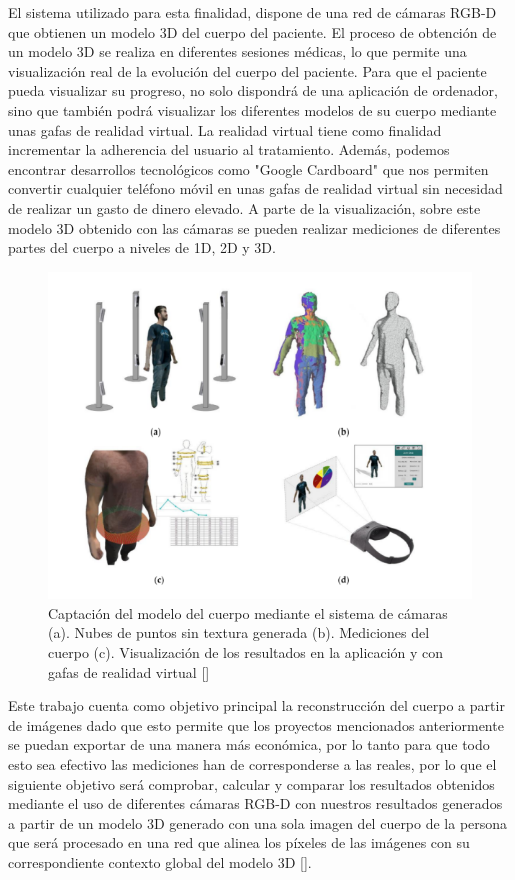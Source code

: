 	El sistema utilizado para esta finalidad, dispone de una red de cámaras RGB-D que
	obtienen un modelo 3D del cuerpo del paciente. El proceso de obtención de un modelo 3D se realiza en diferentes sesiones médicas, lo que permite una visualización real de la evolución del cuerpo del paciente. Para que el paciente pueda visualizar su progreso, no solo dispondrá de una aplicación de ordenador, sino que también podrá visualizar los diferentes modelos de su cuerpo mediante unas gafas de realidad virtual. La realidad virtual tiene como finalidad incrementar la adherencia del usuario al tratamiento. Además, podemos encontrar desarrollos tecnológicos como "Google Cardboard" que nos permiten convertir cualquier teléfono móvil en unas gafas de realidad virtual sin necesidad de realizar un gasto de dinero elevado.
	A parte de la visualización, sobre este modelo 3D obtenido con las cámaras se pueden realizar mediciones de diferentes partes del cuerpo a niveles de 1D, 2D y 3D. 
	
	\begin{figure}[H]
		\centering
		\includegraphics[scale=0.7]{imagenes/intro1.png}
		\caption{Captación del modelo del cuerpo mediante el sistema de cámaras (a). Nubes de puntos sin textura generada (b). Mediciones del cuerpo (c). Visualización de los resultados en la aplicación y con gafas de realidad virtual [\cite{Nahuel1}]}
		\label{fig:figura1}
	\end{figure}

	Este trabajo cuenta como objetivo principal la reconstrucción del cuerpo a partir de imágenes dado que esto permite que los proyectos mencionados anteriormente se puedan exportar de una manera más económica, por lo tanto para que todo esto sea efectivo las mediciones han de corresponderse a las reales, por lo que el siguiente objetivo será comprobar, calcular y comparar los resultados obtenidos mediante el uso de diferentes cámaras RGB-D con nuestros resultados generados a partir de un modelo 3D generado con una sola imagen del cuerpo de la persona que será procesado en una red que alinea los píxeles de las imágenes con su correspondiente contexto global del modelo 3D [\cite{pifu}].

